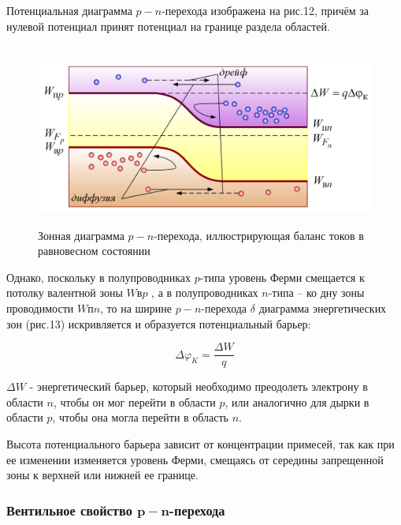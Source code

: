 	\par Потенциальная диаграмма \(p-n\)-перехода изображена на рис.12, причём за нулевой потенциал принят потенциал на границе раздела областей.
	
	\begin{figure}[h]
		\centering
		\includegraphics[height=6cm]{img/14} 
		\captionsetup{font=footnotesize}
		\caption{Зонная диаграмма \(p-n\)-перехода, иллюстрирующая баланс токов в равновесном состоянии} 
	\end{figure}
	
	\par  Однако, поскольку в полупроводниках \(p\)-типа уровень Ферми смещается к потолку валентной зоны \(W\)в\(p\) , а в полупроводниках \(n\)-типа – ко дну зоны проводимости \(W\)п\(n\), то на ширине \(p-n\)-перехода $\delta$ диаграмма энергетических зон (рис.13) искривляется и образуется потенциальный барьер:
	
	\begin{equation}
		\Delta \varphi_K = \dfrac{\Delta W}{q}
	\end{equation}
	
	\par $\Delta W$ - энергетический барьер, который необходимо преодолеть электрону в области \(n\), чтобы он мог перейти в области \(p\), или аналогично для дырки в области \(p\), чтобы она могла перейти в область \(n\).
	
    \par Высота потенциального барьера зависит от концентрации примесей, так как при ее изменении изменяется уровень Ферми, смещаясь от середины запрещенной зоны к верхней или нижней ее границе.
    
    \subsubsection{Вентильное свойство $\boldsymbol{p-n}$-перехода}
    
